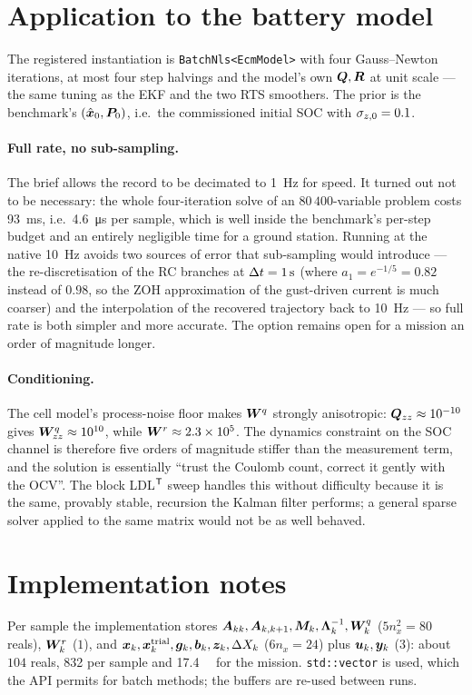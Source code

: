 \section{Application to the battery model}
The registered instantiation is \texttt{BatchNls<EcmModel>} with four Gauss--Newton iterations, at
most four step halvings and the model's own $\bm{Q},\bm{R}$ at unit scale --- the same tuning as the EKF
and the two RTS smoothers.  The prior is the benchmark's $(\hat{\bm{x}}_0,\bm{P}_0)$, i.e.\ the commissioned
initial SOC with $\sigma_{z,0}=0.1$.

\paragraph{Full rate, no sub-sampling.}  The brief allows the record to be decimated to
\SI{1}{\hertz} for speed.  It turned out not to be necessary: the whole four-iteration solve of an
$80\,400$-variable problem costs \SI{93}{\milli\second}, i.e.\ \SI{4.6}{\micro\second} per sample,
which is well inside the benchmark's per-step budget and an entirely negligible time for a ground
station.  Running at the native \SI{10}{\hertz} avoids two sources of error that sub-sampling would
introduce --- the re-discretisation of the RC branches at $\Delta t=\SI{1}{\second}$ (where
$a_1=e^{-1/5}=0.82$ instead of $0.98$, so the ZOH approximation of the gust-driven current is much
coarser) and the interpolation of the recovered trajectory back to \SI{10}{\hertz} --- so full rate
is both simpler and more accurate.  The option remains open for a mission an order of magnitude
longer.

\paragraph{Conditioning.}  The cell model's process-noise floor makes $\bm{W}^q$ strongly anisotropic:
$\bm{Q}_{zz}\approx10^{-10}$ gives $\bm{W}^q_{zz}\approx10^{10}$, while
$\bm{W}^r\approx2.3\times10^{5}$.  The dynamics constraint on the SOC channel is therefore five orders
of magnitude stiffer than the measurement term, and the solution is essentially ``trust the Coulomb
count, correct it gently with the OCV''.  The block LDL$^{\mathsf{T}}$ sweep handles this without difficulty
because it is the same, provably stable, recursion the Kalman filter performs; a general sparse
solver applied to the same matrix would not be as well behaved.

\section{Implementation notes}
Per sample the implementation stores $\bm{A}_{kk},\bm{A}_{k,k+1},\bm{M}_k,\bm{\Lambda}_k^{-1},\bm{W}^q_k$
($5n_x^2=80$ reals), $\bm{W}^r_k$ ($1$), and $\bm{x}_k,\bm{x}^\text{trial}_k,\bm{g}_k,\bm{b}_k,\bm{z}_k,\Delta X_k$
($6n_x=24$) plus $\bm{u}_k,\bm{y}_k$ ($3$): about $104$ reals, \SI{832}{\byte} per sample and
\SI{17.4}{\mega\byte} for the mission.  \texttt{std::vector} is used, which the API permits for
batch methods; the buffers are re-used between runs.

